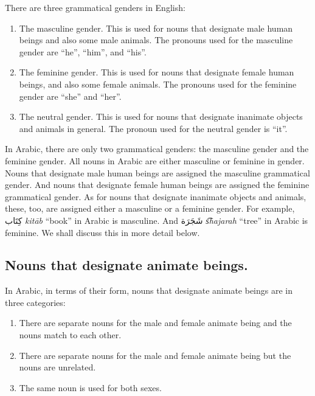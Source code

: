 \documentclass[
  10pt,
]{book}
\providecommand{\tightlist}{%
  \setlength{\itemsep}{0pt}\setlength{\parskip}{0pt}}
\begin{document}
There are three grammatical genders in English:

\begin{enumerate}
\def\labelenumi{\arabic{enumi}.}
\tightlist
\item
  The masculine gender. This is used for nouns that designate male human beings and also some male animals. The pronouns used for the masculine gender are \enquote{he}, \enquote{him}, and \enquote{his}.
\item
  The feminine gender. This is used for nouns that designate female human beings, and also some female animals. The pronouns used for the feminine gender are \enquote{she} and \enquote{her}.
\item
  The neutral gender. This is used for nouns that designate inanimate objects and animals in general. The pronoun used for the neutral gender is \enquote{it}.
\end{enumerate}

In Arabic, there are only two grammatical genders: the masculine gender and the feminine gender.
All nouns in Arabic are either masculine or feminine in gender.
Nouns that designate male human beings are assigned the masculine grammatical gender. And
nouns that designate female human beings are assigned the feminine grammatical gender.
As for nouns that designate inanimate objects and animals, these, too, are assigned either a masculine or a feminine gender. For example, \foreignlanguage{arabic}{کِتَاب} \emph{kitāb} \enquote{book} in Arabic is masculine. And \foreignlanguage{arabic}{شَجَرَة} \emph{s͡hajarah} \enquote{tree} in Arabic is feminine.
We shall discuss this in more detail below.

\subsection{Nouns that designate animate beings.}\label{nouns-that-designate-animate-beings.}

In Arabic, in terms of their form, nouns that designate animate beings are in three categories:

\begin{enumerate}
\def\labelenumi{\arabic{enumi}.}
\tightlist
\item
  There are separate nouns for the male and female animate being and the nouns match to each other.
\item
  There are separate nouns for the male and female animate being but the nouns are unrelated.
\item
  The same noun is used for both sexes.
\end{enumerate}
\end{document}
